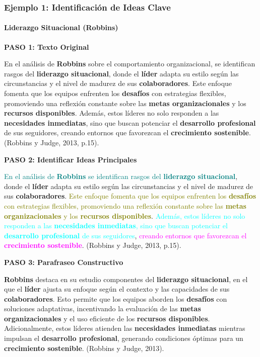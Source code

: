 \documentclass[aspectratio=169]{beamer}
\begin{document}
\begin{frame}[allowframebreaks]
	\frametitle{Ejemplo 1: Identificación de Ideas Clave}
	\framesubtitle{Liderazgo Situacional (Robbins)}
	
	\textbf{PASO 1: Texto Original}
	\begin{block}{}
		\small
		En el análisis de \textbf{Robbins} sobre el comportamiento organizacional, se identifican rasgos del \textbf{liderazgo situacional}, donde el \textbf{líder} adapta su estilo según las circunstancias y el nivel de madurez de sus \textbf{colaboradores}. Este enfoque fomenta que los equipos enfrenten los \textbf{desafíos} con estrategias flexibles, promoviendo una reflexión constante sobre las \textbf{metas organizacionales} y los \textbf{recursos disponibles}. Además, estos líderes no solo responden a las \textbf{necesidades inmediatas}, sino que buscan potenciar el \textbf{desarrollo profesional} de sus seguidores, creando entornos que favorezcan el \textbf{crecimiento sostenible}. (Robbins y Judge, 2013, p.15).
	\end{block}
	
	\framebreak
	
	\textbf{PASO 2: Identificar Ideas Principales}
	\begin{block}{}
		\small
		\textcolor{teal}{En el análisis de \textbf{Robbins} se identifican rasgos del \textbf{liderazgo situacional}}, donde el \textbf{líder} adapta su estilo según las circunstancias y el nivel de madurez de sus \textbf{colaboradores}. \textcolor{olive}{Este enfoque fomenta que los equipos enfrenten los \textbf{desafíos} con estrategias flexibles, promoviendo una reflexión constante sobre las \textbf{metas organizacionales} y los \textbf{recursos disponibles}}. \textcolor{cyan}{Además, estos líderes no solo responden a las \textbf{necesidades inmediatas}, sino que buscan potenciar el \textbf{desarrollo profesional} de sus seguidores}, \textcolor{magenta}{creando entornos que favorezcan el \textbf{crecimiento sostenible}}. (Robbins y Judge, 2013, p.15).
	\end{block}
	
	\framebreak
	
	\textbf{PASO 3: Parafraseo Constructivo}
	\begin{block}{}
		\small
		\textbf{Robbins} destaca en su estudio componentes del \textbf{liderazgo situacional}, en el que el \textbf{líder} ajusta su enfoque según el contexto y las capacidades de sus \textbf{colaboradores}. Esto permite que los equipos aborden los \textbf{desafíos} con soluciones adaptativas, incentivando la evaluación de las \textbf{metas organizacionales} y el uso eficiente de los \textbf{recursos disponibles}. Adicionalmente, estos líderes atienden las \textbf{necesidades inmediatas} mientras impulsan el \textbf{desarrollo profesional}, generando condiciones óptimas para un \textbf{crecimiento sostenible}. (Robbins y Judge, 2013).
	\end{block}
\end{frame}
\end{document}
